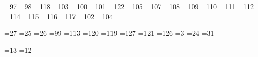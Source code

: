 %
=97  %
{}=98  %
{}=118 %
{}=103 %
{}=100 %
{}=101 %
{}=122 %
{}=105 %
{}=107 %
{}=108 %
{}=109 %
{}=110 %
{}=111 %
{}=112 %
{}=114 %
{}=115 %
{}=116 %
{}=117 %
{}=102 %
{}=104 %
\iftrue
{}=27  %
{}=25  %
{}=26  %
{}=99  %
{}=113 %
{}=120 %
{}=119 %
{}=127 %
{}=121 %
{}=126 %
{}=3   %
{}=24  %
{}=31  %
\else
\lccode`0=`0
\lccode`1=`1
\lccode`2=`2
\catcode 163=13 \def^^a3{e00}  %
\catcode 214=13 \def^^d6{zh}   %
\catcode 202=13 \def^^ca{i00}  %
\catcode 195=13 \def^^c3{ts}   %
\catcode 222=13 \def^^de{ch}   %
\catcode 219=13 \def^^db{sh}   %
\catcode 221=13 \def^^dd{shch} %
\catcode 223=13 \def^^df{p02}  %
\catcode 217=13 \def^^d9{y}    %
\catcode 216=13 \def^^d8{p01}  %
\catcode 220=13 \def^^dc{e01}  %
\catcode 192=13 \def^^c0{yu}   %
\catcode 209=13 \def^^d1{ya}   %
\fi
=13 %
{}=12 %
